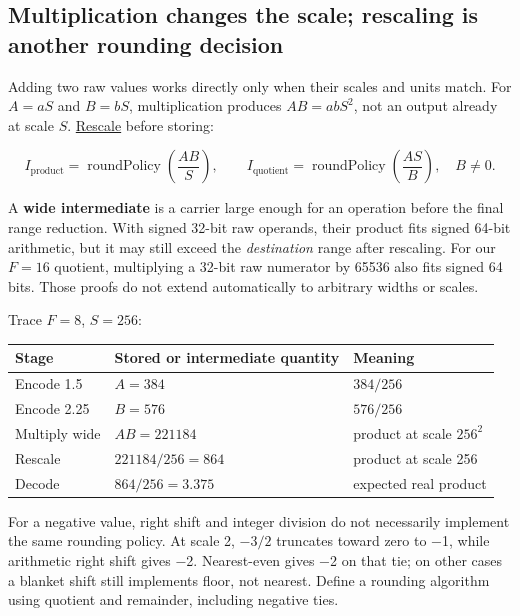 \subsection{Multiplication changes the scale; rescaling is another rounding decision}\label{01-foundations-i-ch001-multiplication-changes-the-scale-rescaling-is-another-rounding-decision}

Adding two raw values works directly only when their scales and units match. For \(A=aS\) and \(B=bS\), multiplication produces \(AB=abS^2\), not an output already at scale \(S\). \hyperref[appendix-3333db47830f]{Rescale} before storing:

\[
I_{\mathrm{product}}=\operatorname{roundPolicy}\!\left(\frac{AB}{S}\right),
\qquad
I_{\mathrm{quotient}}=\operatorname{roundPolicy}\!\left(\frac{AS}{B}\right),\quad B\ne0.
\]

A \textbf{wide intermediate} is a carrier large enough for an operation before the final range reduction. With signed 32-bit raw operands, their product fits signed 64-bit arithmetic, but it may still exceed the \emph{destination} range after rescaling. For our \(F=16\) quotient, multiplying a 32-bit raw numerator by 65536 also fits signed 64 bits. Those proofs do not extend automatically to arbitrary widths or scales.

Trace \(F=8\), \(S=256\):

{\def\LTcaptype{none} %
\begin{longtable}[]{@{}lll@{}}
\toprule\noalign{}
Stage & Stored or intermediate quantity & Meaning \\
\midrule\noalign{}
\endhead
\bottomrule\noalign{}
\endlastfoot
Encode 1.5 & \(A=384\) & \(384/256\) \\
Encode 2.25 & \(B=576\) & \(576/256\) \\
Multiply wide & \(AB=221184\) & product at scale \(256^2\) \\
Rescale & \(221184/256=864\) & product at scale 256 \\
Decode & \(864/256=3.375\) & expected real product \\
\end{longtable}
}

For a negative value, right shift and integer division do not necessarily implement the same rounding policy. At scale 2, \(-3/2\) truncates toward zero to −1, while arithmetic right shift gives −2. Nearest-even gives −2 on that tie; on other cases a blanket shift still implements floor, not nearest. Define a rounding algorithm using quotient and remainder, including negative ties.

